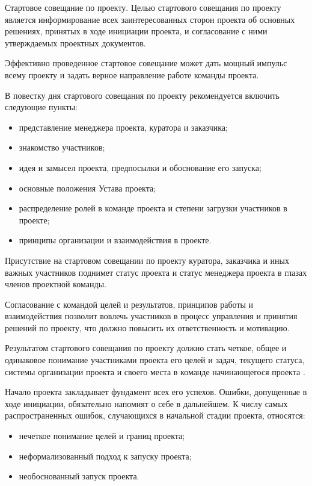 Стартовое совещание по проекту.
Целью стартового совещания по проекту является информирование всех заинтересованных сторон проекта об основных решениях, приня­тых в ходе инициации проекта, и согласование с ними утверждаемых проектных документов.

Эффективно проведенное стартовое совещание может дать мощный импульс всему проекту и задать верное направление работе команды проекта.

В повестку дня стартового совещания по проекту рекомендуется включить следующие пункты:
\begin{itemize}
	\item представление менеджера проекта, куратора и заказчика;
	\item знакомство участников;
	\item идея и замысел проекта, предпосылки и обоснование его запуска;
	\item основные положения Устава проекта;
	\item распределение ролей в команде проекта и степени загрузки участ­ников в проекте;
	\item принципы организации и взаимодействия в проекте.
\end{itemize}

Присутствие на стартовом совещании по проекту куратора, заказ­чика и иных важных участников поднимет статус проекта и статус менеджера проекта в глазах членов проектной команды.

Согласование с командой целей и результатов, принципов работы и взаимодействия позволит вовлечь участников в процесс управления и принятия решений по проекту, что должно повысить их ответствен­ность и мотивацию.

Результатом стартового совещания по проекту должно стать четкое, общее и одинаковое понимание участниками проекта его целей и за­дач, текущего статуса, системы организации проекта и своего места в команде начинающегося проекта \cite[145]{polkovnikov}.

Начало проекта закладывает фундамент всех его успехов.
Ошибки, допущенные в ходе инициации, обязательно напомнят о себе в даль­нейшем.
К числу самых распространенных ошибок, случающихся в начальной стадии проекта, относятся:
\begin{itemize}
	\item нечеткое понимание целей и границ проекта;
	\item неформализованный подход к запуску проекта;
	\item необоснованный запуск проекта.
\end{itemize}

